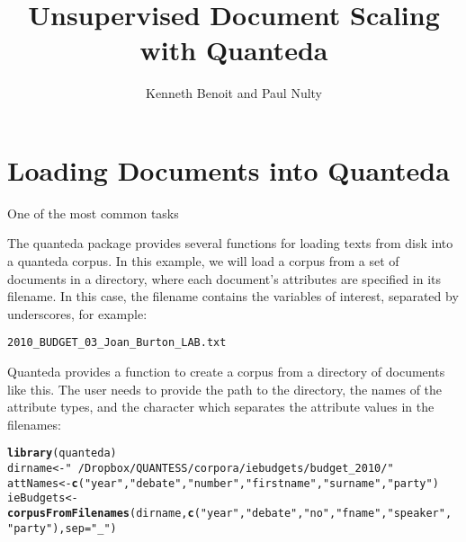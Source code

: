 \documentclass{article}\usepackage[]{graphicx}\usepackage[]{color}
\makeatletter
\newcommand{\hlstr}[1]{\textcolor[rgb]{0.192,0.494,0.8}{#1}}%
\newcommand{\hlstd}[1]{\textcolor[rgb]{0.345,0.345,0.345}{#1}}%
\newcommand{\hlkwb}[1]{\textcolor[rgb]{0.69,0.353,0.396}{#1}}%
\newcommand{\hlkwc}[1]{\textcolor[rgb]{0.333,0.667,0.333}{#1}}%
\newcommand{\hlkwd}[1]{\textcolor[rgb]{0.737,0.353,0.396}{\textbf{#1}}}%
\newenvironment{kframe}{%
 \def\at@end@of@kframe{}%
 \ifinner\ifhmode%
  \def\at@end@of@kframe{\end{minipage}}%
  \begin{minipage}{\columnwidth}%
 \fi\fi%
 \def\FrameCommand##1{\hskip\@totalleftmargin \hskip-\fboxsep
 \colorbox{shadecolor}{##1}\hskip-\fboxsep
     \hskip-\linewidth \hskip-\@totalleftmargin \hskip\columnwidth}%
 \MakeFramed {\advance\hsize-\width
   \@totalleftmargin\z@ \linewidth\hsize
   \@setminipage}}%
 {\par\unskip\endMakeFramed%
 \at@end@of@kframe}
\newenvironment{knitrout}{}{} %
\makeatother
\begin{document}





\title{Unsupervised Document Scaling with Quanteda}


\author{Kenneth Benoit and Paul Nulty}

\maketitle

\section*{Loading Documents into Quanteda}

One of the most common tasks 

The quanteda package provides several functions for loading texts from disk into a quanteda corpus. In this example, we will load a corpus from a set of documents in a directory, where each document's attributes are specified in its filename. In this case, the filename contains the variables of interest, separated by underscores, for example:

\texttt{2010\_BUDGET\_03\_Joan\_Burton\_LAB.txt}

Quanteda provides a function to create a corpus from a directory of documents like this. The user needs to provide the path to the directory, the names of the attribute types, and the character which separates the attribute values in the filenames:

\begin{knitrout}
\color{fgcolor}\begin{kframe}
\begin{alltt}
\hlkwd{library}\hlstd{(quanteda)}
\hlstd{dirname} \hlkwb{<-} \hlstr{"~/Dropbox/QUANTESS/corpora/iebudgets/budget_2010/"}
\hlstd{attNames} \hlkwb{<-} \hlkwd{c}\hlstd{(}\hlstr{"year"}\hlstd{,} \hlstr{"debate"}\hlstd{,} \hlstr{"number"}\hlstd{,} \hlstr{"firstname"}\hlstd{,} \hlstr{"surname"}\hlstd{,} \hlstr{"party"}\hlstd{)}
\hlstd{ieBudgets} \hlkwb{<-} \hlkwd{corpusFromFilenames}\hlstd{(dirname,} \hlkwd{c}\hlstd{(}\hlstr{"year"}\hlstd{,} \hlstr{"debate"}\hlstd{,} \hlstr{"no"}\hlstd{,} \hlstr{"fname"}\hlstd{,} \hlstr{"speaker"}\hlstd{,}
    \hlstr{"party"}\hlstd{),} \hlkwc{sep} \hlstd{=} \hlstr{"_"}\hlstd{)}
\end{alltt}
\end{kframe}
\end{knitrout}
\end{document}
